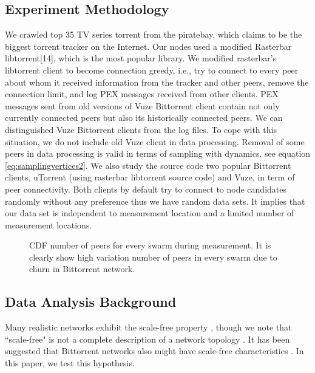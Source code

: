 \documentclass[10pt,conference,letterpaper]{IEEEtran}
\begin{document}
\subsection{Experiment Methodology}
We crawled top 35 TV series torrent from the piratebay, which claims to be the biggest torrent tracker on the Internet.
Our nodes used a modified Rasterbar libtorrent[14], which is the most popular library.  %
We modified rasterbar's libtorrent client to become connection greedy, i.e., try to connect to every peer about whom it received information from the tracker and other peers, remove the connection limit, and log PEX messages received from other clients.
PEX messages sent from old versions of Vuze Bittorrent client contain not only currently connected peers but also its historically connected peers. 
We can distinguished Vuze Bittorrent clients from the log files.
To cope with this situation, we do not include old Vuze client in data processing. 
Removal of some peers in data processing is valid in terms of sampling with dynamics, see equation \ref{eq:samplingvertices2}.
We also study the source code two popular Bittorrent clients, uTorrent (using rasterbar libtorrent source code) and Vuze, in term of peer connectivity.
Both clients by default try to connect to node candidates randomly without any preference thus we have random data sets.
It implies that our data set is independent to measurement location and a limited number of measurement locations.

\begin{figure}
\centering
{}
\caption{CDF number of peers for every swarm during measurement. It is clearly show high variation number of peers in every swarm due to churn in Bittorrent network.} 
\label{fig:num_peers}
\vspace{-5mm}
\end{figure}

\subsection{Data Analysis Background}
Many realistic networks exhibit the scale-free property \cite{clauset2009power}, though we note that ``scale-free" is not a complete description of a network topology \cite{doyle2005robust}\cite{mahadevan2006systematic}. 
It has been suggested that Bittorrent networks also might have scale-free characteristics \cite{dale2008evolution}. 
In this paper, we test this hypothesis. 
\end{document}

